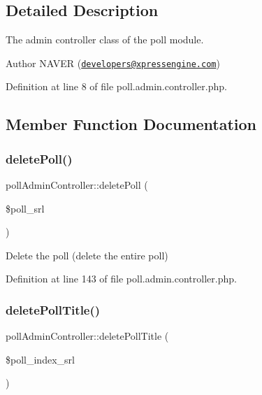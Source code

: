 \subsection{Detailed Description}
The admin controller class of the poll module. 

\begin{DoxyAuthor}{Author}
N\+A\+V\+ER (\href{mailto:developers@xpressengine.com}{\tt developers@xpressengine.\+com}) 
\end{DoxyAuthor}


Definition at line 8 of file poll.\+admin.\+controller.\+php.



\subsection{Member Function Documentation}
\mbox{\label{classpollAdminController_ab8fa4ab256e902120f27dac1edea8f57}} 
\subsubsection{\texorpdfstring{delete\+Poll()}{deletePoll()}}
{\footnotesize\ttfamily poll\+Admin\+Controller\+::delete\+Poll (\begin{DoxyParamCaption}\item[{}]{\$poll\+\_\+srl }\end{DoxyParamCaption})}



Delete the poll (delete the entire poll) 



Definition at line 143 of file poll.\+admin.\+controller.\+php.

\mbox{\label{classpollAdminController_acd355746ff4a145b974b2a95b9c0eda9}} 
\subsubsection{\texorpdfstring{delete\+Poll\+Title()}{deletePollTitle()}}
{\footnotesize\ttfamily poll\+Admin\+Controller\+::delete\+Poll\+Title (\begin{DoxyParamCaption}\item[{}]{\$poll\+\_\+index\+\_\+srl }\end{DoxyParamCaption})}



